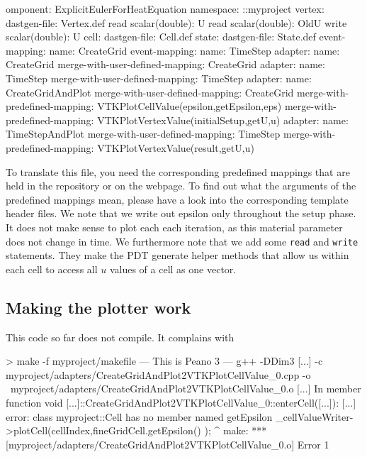\begin{code}
omponent: ExplicitEulerForHeatEquation
namespace: ::myproject
vertex:
  dastgen-file: Vertex.def
  read scalar(double): U
  read scalar(double): OldU
  write scalar(double): U
cell:
  dastgen-file: Cell.def
state:
  dastgen-file: State.def
event-mapping:
  name: CreateGrid
event-mapping:
  name: TimeStep
adapter:
  name: CreateGrid
  merge-with-user-defined-mapping: CreateGrid
adapter:
  name: TimeStep
  merge-with-user-defined-mapping: TimeStep
adapter:
  name: CreateGridAndPlot
  merge-with-user-defined-mapping: CreateGrid
  merge-with-predefined-mapping: VTKPlotCellValue(epsilon,getEpsilon,eps)
  merge-with-predefined-mapping: VTKPlotVertexValue(initialSetup,getU,u)
adapter:
  name: TimeStepAndPlot
  merge-with-user-defined-mapping: TimeStep
  merge-with-predefined-mapping: VTKPlotVertexValue(result,getU,u)
\end{code}

\noindent
To translate this file, you need the corresponding predefined mappings that are 
held in the repository or on the webpage.
To find out what the arguments of the predefined mappings mean, please have a 
look into the corresponding template header files.
We note that we write out epsilon only throughout the setup phase. 
It does not make sense to plot each each iteration, as this material parameter
does not change in time.
We furthermore note that we add some \texttt{read} and \texttt{write}
statements.
They make the PDT generate helper methods that allow us within each cell to
access all $u$ values of a cell as one vector.



\subsection{Making the plotter work}

This code so far does not compile. It complains with

\begin{code}
> make -f myproject/makefile
--- This is Peano 3 ---
g++ -DDim3 [...] -c myproject/adapters/CreateGridAndPlot2VTKPlotCellValue_0.cpp -o \
myproject/adapters/CreateGridAndPlot2VTKPlotCellValue_0.o 
[...]  In member function void [...]::CreateGridAndPlot2VTKPlotCellValue_0::enterCell([...]):
[...] error: class myproject::Cell has no member named getEpsilon
     _cellValueWriter->plotCell(cellIndex,fineGridCell.getEpsilon() );
                                                       ^
make: *** [myproject/adapters/CreateGridAndPlot2VTKPlotCellValue_0.o] Error 1
\end{code}

